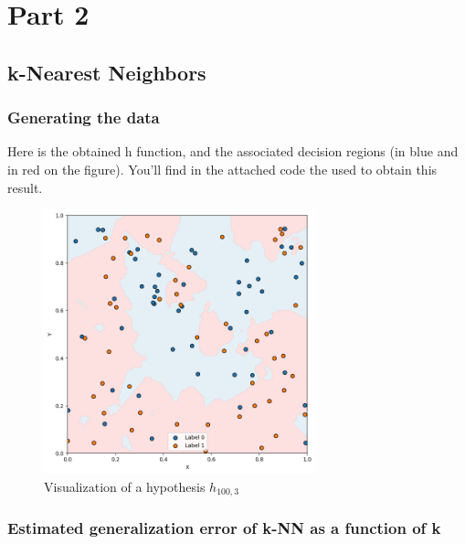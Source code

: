 \documentclass[final,3p,times,12pt]{article}
\begin{document}
\section{Part 2}

\begin{enumerate}
    \subsection{k-Nearest Neighbors}
        \subsubsection{Generating the data}

            Here is the obtained h function, and the associated decision regions (in blue and in red on the figure). You'll find in the attached code the used to obtain this result.

            \begin{figure}[H] %
                \centering %
                \includegraphics[width=0.7\textwidth]{images/image_part2.png}
                \caption{Visualization of a hypothesis $h_{100,3}$} %
                \label{fig:image1} %
            \end{figure}

        \subsubsection{Estimated generalization error of k-NN as a function of k}


\end{enumerate}
\end{document}

